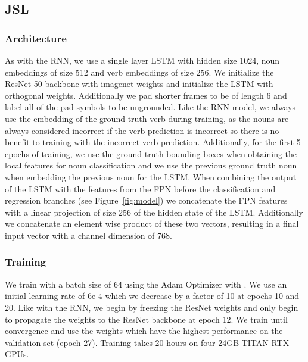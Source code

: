 \documentclass[runningheads]{llncs}
\begin{document}
\subsection{JSL}
\subsubsection{Architecture}
As with the RNN, we use a single layer LSTM with hidden size 1024, noun embeddings of size 512 and verb embeddings of size 256. We initialize the ResNet-50 backbone with imagenet weights and initialize the LSTM with orthogonal weights. Additionally we pad shorter frames to be of length 6 and label all of the pad symbols to be ungrounded. Like the RNN model, we always use the embedding of the ground truth verb during training, as the nouns are always considered incorrect if the verb prediction is incorrect so there is no benefit to training with the incorrect verb prediction. Additionally, for the first 5 epochs of training, we use the ground truth bounding boxes when obtaining the local features for noun classification and we use the previous ground truth noun when embedding the previous noun for the LSTM. When combining the output of the LSTM with the features from the FPN before the classification and regression branches (see Figure~\ref{fig:model}) we concatenate the FPN features with a linear projection of size 256 of the hidden state of the LSTM. Additionally we concatenate an element wise product of these two vectors, resulting in a final input vector with a channel dimension of 768.  

\subsubsection{Training}
We train with a batch size of 64 using the Adam Optimizer \cite{KingmaAndBa2015} with . We use an initial learning rate of 6e-4 which we decrease by a factor of 10 at epochs 10 and 20. Like with the RNN, we begin by freezing the ResNet weights and only begin to propagate the weights to the ResNet backbone at epoch 12. We train until convergence and use the weights which have the highest performance on the validation set (epoch 27). Training takes 20 hours on four 24GB TITAN RTX GPUs. 
\end{document}
